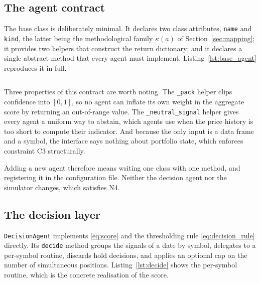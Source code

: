 \subsection{The agent contract}\label{subsec:agent_contract}

The base class is deliberately minimal. It declares two class attributes, \texttt{name} and \texttt{kind}, the latter being the methodological family $\kappa(a)$ of Section~\ref{sec:mapping}; it provides two helpers that construct the return dictionary; and it declares a single abstract method that every agent must implement. Listing~\ref{lst:base_agent} reproduces it in full.

\begin{listing}[!htbp]
\inputminted[linenos, frame=single, breaklines, fontsize=\footnotesize]{python}{other/BaseAgent.py}
\caption{The abstract base class defining the agent contract.}
\label{lst:base_agent}
\end{listing}

Three properties of this contract are worth noting. The \texttt{\_pack} helper clips confidence into $[0,1]$, so no agent can inflate its own weight in the aggregate score by returning an out-of-range value. The \texttt{\_neutral\_signal} helper gives every agent a uniform way to abstain, which agents use when the price history is too short to compute their indicator. And because the only input is a data frame and a symbol, the interface says nothing about portfolio state, which enforces constraint C3 structurally.

Adding a new agent therefore means writing one class with one method, and registering it in the configuration file. Neither the decision agent nor the simulator changes, which satisfies N4.

\subsection{The decision layer}\label{subsec:decision_impl}

\texttt{DecisionAgent} implements \eqref{eq:score} and the thresholding rule \eqref{eq:decision_rule} directly. Its \texttt{decide} method groups the signals of a date by symbol, delegates to a per-symbol routine, discards hold decisions, and applies an optional cap on the number of simultaneous positions. Listing~\ref{lst:decide} shows the per-symbol routine, which is the concrete realisation of the score.

\begin{listing}[!htbp]
\inputminted[linenos, frame=single, breaklines, fontsize=\footnotesize]{python}{other/decide_for_symbol.py}
\caption{Per-symbol aggregation: the implementation of the confidence-weighted score of \eqref{eq:score} and of the thresholding rule of \eqref{eq:decision_rule}.}
\label{lst:decide}
\end{listing}

